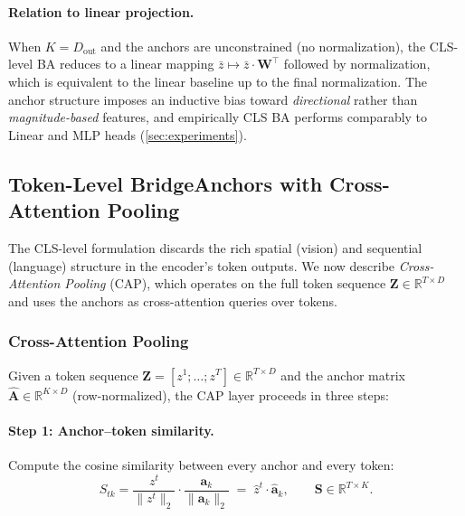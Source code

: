 \paragraph{Relation to linear projection.}  When $K = D_{\text{out}}$ and the anchors are unconstrained (no normalization), the CLS-level BA reduces to a linear mapping $\bar{z} \mapsto \bar{z} \cdot \mathbf{W}^\top$ followed by normalization, which is equivalent to the linear baseline up to the final normalization.  The anchor structure imposes an inductive bias toward \emph{directional} rather than \emph{magnitude-based} features, and empirically CLS BA performs comparably to Linear and MLP heads (\cref{sec:experiments}).

\subsection{Token-Level BridgeAnchors with Cross-Attention Pooling}
\label{sec:cap}

The CLS-level formulation discards the rich spatial (vision) and sequential (language) structure in the encoder's token outputs.  We now describe \emph{Cross-Attention Pooling} (CAP), which operates on the full token sequence $\mathbf{Z} \in \mathbb{R}^{T \times D}$ and uses the anchors as cross-attention queries over tokens.

\subsubsection{Cross-Attention Pooling}

Given a token sequence $\mathbf{Z} = [z^1; \ldots; z^T] \in \mathbb{R}^{T \times D}$ and the anchor matrix $\hat{\mathbf{A}} \in \mathbb{R}^{K \times D}$ (row-normalized), the CAP layer proceeds in three steps:

\paragraph{Step 1: Anchor--token similarity.}
Compute the cosine similarity between every anchor and every token:
\begin{equation}
    S_{tk} = \frac{z^t}{\|z^t\|_2} \cdot \frac{\mathbf{a}_k}{\|\mathbf{a}_k\|_2}
    \;=\; \hat{z}^t \cdot \hat{\mathbf{a}}_k,
    \qquad
    \mathbf{S} \in \mathbb{R}^{T \times K}.
    \label{eq:sim_matrix}
\end{equation}

